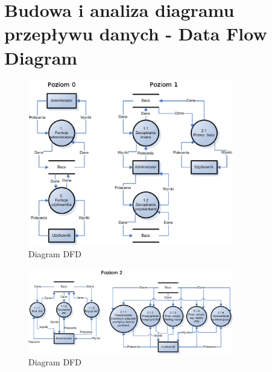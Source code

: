 \section{Budowa i analiza diagramu przepływu danych - Data Flow Diagram }
\begin{figure}[!htp]
  \centering
  \includegraphics[width=0.8\textwidth]{./img/schema_a.eps}
  \caption{Diagram DFD}
  \label{fig:scr3a}
\end{figure}
\begin{figure}[!htp]
  \centering
  \includegraphics[width=0.8\textwidth]{./img/schema_b.eps}
  \caption{Diagram DFD}
  \label{fig:scr3b}
\end{figure}
